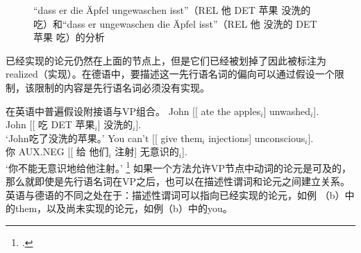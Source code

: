 \begin{figure}
\caption{“dass er die Äpfel ungewaschen isst”（REL 他 DET 苹果 没洗的 吃）和“dass er ungewaschen die Äpfel isst”（REL 他 没洗的 DET 苹果 吃）的分析}\label{anal-er-die-frau-nackt-sieht}
\end{figure}%
已经实现的论元仍然在上面的节点上，但是它们已经被划掉了因此被标注为realized（实现）。在德语中，要描述这一先行语名词的偏向可以通过假设一个限制，该限制的内容是先行语名词必须没有实现。

在英语中普遍假设附接语与VP组合。
\eal
\ex 
\gll John [[ ate the apples$_i$] unwashed$_i$].\\
	John [[ 吃 DET 苹果$_i$] 没洗的$_i$].\\
\glt `John吃了没洗的苹果。'
\ex 
\gll You can't [[ give them$_i$ injections] unconscious$_i$].\\
	你 AUX.NEG [[ 给 他们$_i$ 注射] 无意识的$_i$].\\
\glt `你不能无意识地给他注射。'
\footnote{
.
}
\zl
如果一个方法允许VP节点中动词的论元是可及的，那么就即使是先行语名词在VP之后，也可以在描述性谓词和论元之间建立关系。英语与德语的不同之处在于：描述性谓词可以指向已经实现的论元，如例 （b）中的them，以及尚未实现的论元，如例（b）中的you。

